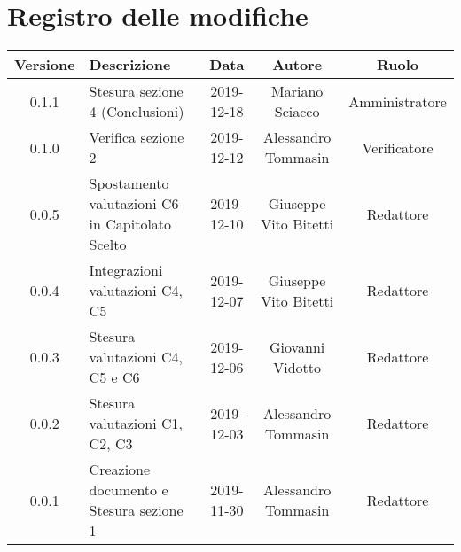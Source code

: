 \section*{Registro delle modifiche}

\begin{center}
	\begin{longtable}{|c|p{4cm}|c|c|c|}
	\hline
	\rowcolor{lighter-grayer}
	\textbf{Versione} & \textbf{Descrizione} & \textbf{Data} & \textbf{Autore} & \textbf{Ruolo} \\
	\hline
	\endfirsthead

	
	\hline
	0.1.1 & Stesura sezione 4 (Conclusioni) & 2019-12-18 & Mariano Sciacco & Amministratore \\
	\hline
	0.1.0 & Verifica sezione 2 & 2019-12-12 & Alessandro Tommasin & Verificatore \\
	\hline
	0.0.5 & Spostamento valutazioni C6 in Capitolato Scelto & 2019-12-10 & Giuseppe Vito Bitetti & Redattore \\
	\hline
	0.0.4 & Integrazioni valutazioni C4, C5 & 2019-12-07 & Giuseppe Vito Bitetti & Redattore \\
	\hline
	0.0.3 & Stesura valutazioni C4, C5 e C6 & 2019-12-06 & Giovanni Vidotto & Redattore \\
	\hline
	0.0.2 & Stesura valutazioni C1, C2, C3 & 2019-12-03 & Alessandro Tommasin & Redattore \\
	\hline
	0.0.1 & Creazione documento e Stesura sezione 1 & 2019-11-30 & Alessandro Tommasin & Redattore \\
	\hline

	\end{longtable}
\end{center}
